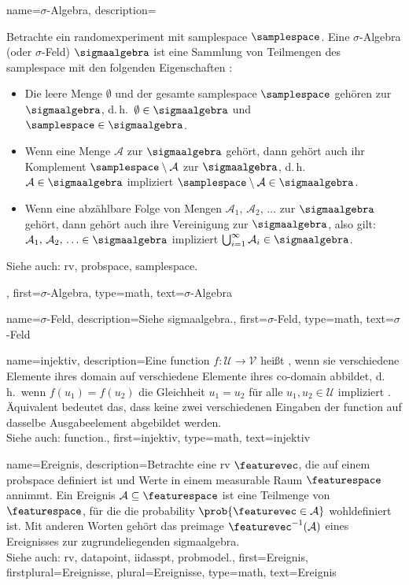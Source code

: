 {{{{
{name={$\sigma$-Algebra}, 
	description={Betrachte ein \gls{randomexperiment} mit \gls{samplespace} $\samplespace$. 
		Eine $\sigma$-Algebra (oder $\sigma$-Feld) $\sigmaalgebra$ 
		ist eine Sammlung von Teilmengen des \gls{samplespace} mit den folgenden Eigenschaften 
		\cite{RudinBook,BillingsleyProbMeasure,durrett2010probability}:
		 \begin{itemize}
		 	\item Die leere Menge $\emptyset$ und der gesamte \gls{samplespace} 
		 	$\samplespace$ gehören zur $\sigmaalgebra$, d.\,h.\ $\emptyset \in \sigmaalgebra$ und $\samplespace \in \sigmaalgebra$.
		 	\item Wenn eine Menge $\mathcal{A}$ zur $\sigmaalgebra$ gehört, dann gehört auch ihr Komplement 
		 	$\samplespace \setminus \mathcal{A}$ zur $\sigmaalgebra$, d.\,h.\ 
		 	$\mathcal{A} \in \sigmaalgebra$ impliziert $\samplespace \setminus \mathcal{A} \in \sigmaalgebra$.
		 	\item Wenn eine abzählbare Folge von Mengen $\mathcal{A}_1, \,\mathcal{A}_2, \,\ldots$ 
			zur $\sigmaalgebra$ gehört, dann gehört auch ihre Vereinigung zur $\sigmaalgebra$, also gilt:
		 	$\mathcal{A}_1, \,\mathcal{A}_2, \,\ldots \in \sigmaalgebra$ impliziert 
		 	$\bigcup_{i=1}^{\infty} \mathcal{A}_i \in \sigmaalgebra$.	
		 \end{itemize}			 
		Siehe auch: \gls{rv}, \gls{probspace}, \gls{samplespace}.},
	first={$\sigma$-Algebra},
	type=math, 
	text={$\sigma$-Algebra} 
}

{name={$\sigma$-Feld}, 
	description={Siehe \gls{sigmaalgebra}.}, 
	first={$\sigma$-Feld},
	type=math,
	text={$\sigma$-Feld} 
}


{name={injektiv}, 
	description={Eine \gls{function} $f: \mathcal{U} \rightarrow \mathcal{V}$ heißt 
	\cite{Huynh2015}, wenn sie verschiedene Elemente ihres \gls{domain} auf verschiedene Elemente 
	ihres \gls{co-domain} abbildet, 
    d.\,h.\ wenn $f(u_1) = f(u_2)$ die Gleichheit $u_1 = u_2$ für alle $u_1, u_2 \in \mathcal{U}$ impliziert 
        \cite{HalmosSet}. 
    Äquivalent bedeutet das, dass keine zwei verschiedenen Eingaben der \gls{function} auf dasselbe Ausgabeelement 
    abgebildet werden.
				\\
		Siehe auch: \gls{function}.},
	first={injektiv},
	type=math,
	text={injektiv} 
}


{name={Ereignis}, 
	description={Betrachte eine \gls{rv} $\featurevec$, die auf einem \gls{probspace} 
	definiert ist und Werte in einem \gls{measurable} Raum $\featurespace$ annimmt. 
	Ein Ereignis $\mathcal{A} \subseteq \featurespace$ ist eine Teilmenge von $\featurespace$, 
	für die die \gls{probability} $\prob{\featurevec \in \mathcal{A}}$ wohldefiniert ist. 
	Mit anderen Worten gehört das \gls{preimage} $\featurevec^{-1}(\mathcal{A})$ 
	eines Ereignisses zur zugrundeliegenden \gls{sigmaalgebra}. 
				\\
		Siehe auch: \gls{rv}, \gls{datapoint}, \gls{iidasspt}, \gls{probmodel}.},
	first={Ereignis},
	firstplural={Ereignisse},
	plural={Ereignisse},
	type=math,
	text={Ereignis} 
}

}}}}
